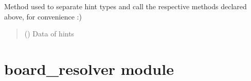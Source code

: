 \documentclass[letterpaper,10pt,english]{sphinxmanual}
\begin{document}
\begin{fulllineitems}
\begin{fulllineitems}
\end{fulllineitems}


\begin{fulllineitems}
\label{\detokenize{condition_analysis:condition_analysis.CondBoard.analyzeBasicCond}}
\pysigstartsignatures
{}
\pysigstopsignatures
\sphinxAtStartPar
Method used to separate hint types and call the
respective methods declared above, for convenience :)
\begin{quote}\begin{description}
\sphinxAtStartPar
{} ({\hyperref[\detokenize{hints:hints.HintsData}]{}}) \textendash{} Data of hints

\end{description}\end{quote}

\end{fulllineitems}


\end{fulllineitems}


\sphinxstepscope


\section{board\_resolver module}
\label{\detokenize{board_resolver:module-board_resolver}}\label{\detokenize{board_resolver:board-resolver-module}}\label{\detokenize{board_resolver::doc}}
\end{document}
